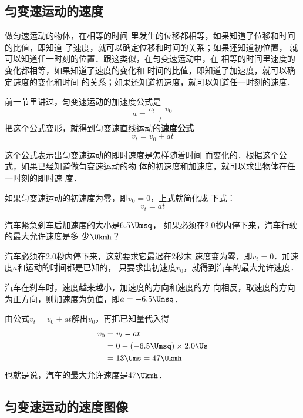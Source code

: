 \subsection{匀变速运动的速度}

做匀速运动的物体，在相等的时间
里发生的位移都相等，如果知道了位移和时间的比值，即知道
了速度，就可以确定位移和时间的关系；如果还知道初位置，
就可以知道任一时刻的位置．跟这类似，在匀变速运动中，在
相等的时间里速度的变化都相等，如果知道了速度的变化和
时间的比值，即知道了加速度，就可以确定速度的变化和时间
的关系；如果还知道初速度，就可以知道任一时刻的速度．

    前一节里讲过，匀变速运动的加速度公式是
\[a=\frac{v_t-v_0}{t} \]
把这个公式变形，就得到匀变速直线运动的\textbf{速度公式}
\[v_t=v_0+at \]

    这个公式表示出匀变速运动的即时速度是怎样随着时间
而变化的．根据这个公式，如果已经知道做匀变速运动的物
体的初速度和加速度，就可以求出物体在任一时刻的即时速
度．

    如果匀变速运动的初速度为零，即$v_0=0$，上式就简化成
下式：
\[v_t=at \]


\begin{example}
汽车紧急刹车后加速度的大小是6.5$\Umsq$，
如果必须在2.0秒内停下来，汽车行驶的最大允许速度是多
少$\Ukmh$？
\end{example}

\begin{solution}
    汽车必须在2.0秒内停下来，这就要求它最迟在2秒末
速度变为零，即$v_t=0$．加速度$a$和运动的时间都是已知的，
只要求出初速度$v_0$，就得到汽车的最大允许速度．

    汽车在刹车时，速度越来越小，加速度的方向和速度的方
向相反，取速度的方向为正方向，则加速度为负值，即$a=-
6.5\Umsq$．

    由公式$v_t=v_0+at$解出$v_0$，再把已知量代入得
\[\begin{split}
v_0&=v_t-at\\
&=0-(-6.5 \Umsq )\times 2.0 \Us \\
&=13 \Ums=47 \Ukmh
\end{split} \]
也就是说，汽车的最大允许速度是47$\Ukmh$．
\end{solution}


\subsection{匀变速运动的速度图像}


